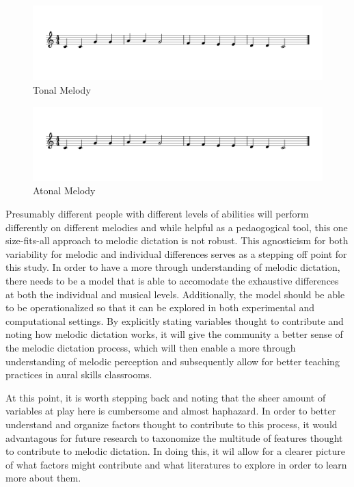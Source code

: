\documentclass[]{book}
\begin{document}
\begin{figure}

{\centering \includegraphics[width=0.8\linewidth]{img/musicalexamples/MMD_Figure2-1} 

}

\caption{Tonal Melody}\label{fig:shortmelody1}
\end{figure}

\begin{figure}

{\centering \includegraphics[width=0.8\linewidth]{img/musicalexamples/MMD_Figure2-1} 

}

\caption{Atonal Melody}\label{fig:shortmelody2}
\end{figure}

Presumably different people with different levels of abilities will perform differently on different melodies and while helpful as a pedaogogical tool, this one size-fits-all approach to melodic dictation is not robust.
This agnosticism for both variability for melodic and individual differences serves as a stepping off point for this study.
In order to have a more through understanding of melodic dictation, there needs to be a model that is able to accomodate the exhaustive differences at both the individual and musical levels.
Additionally, the model should be able to be operationalized so that it can be explored in both experimental and computational settings.
By explicitly stating variables thought to contribute and noting how melodic dictation works, it will give the community a better sense of the melodic dictation process, which will then enable a more through understanding of melodic perception and subsequently allow for better teaching practices in aural skills classrooms.

At this point, it is worth stepping back and noting that the sheer amount of variables at play here is cumbersome and almost haphazard.
In order to better understand and organize factors thought to contribute to this process, it would advantagous for future research to taxonomize the multitude of features thought to contribute to melodic dictation.
In doing this, it wil allow for a clearer picture of what factors might contribute and what literatures to explore in order to learn more about them.
\end{document}
